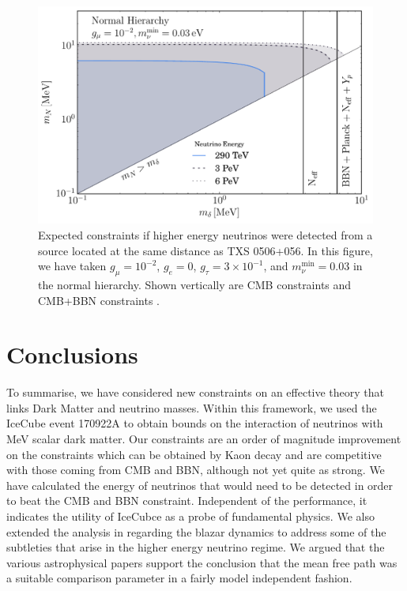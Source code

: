 \documentclass[11pt]{article}
\numberwithin{equation}{section}
\numberwithin{figure}{section}
\numberwithin{table}{section}
\begin{document}
\begin{figure}[t]
 \centering
 \includegraphics[width=.8\textwidth]{mpmnconstraints.pdf}
 \caption{Expected constraints if higher energy neutrinos were detected from a source located at the same distance as TXS 0506+056. In this figure, we have taken $g_\mu = 10^{-2}$, $g_e = 0$, $g_\tau = 3 \times 10^{-1}$, and $m_\nu^{\mathrm{min}} = 0.03$ in the normal hierarchy. Shown vertically are CMB constraints \cite{Boehm} and CMB+BBN constraints \cite{Nollett2015}.}
 \label{fig:mpmn}
\end{figure}


\section{Conclusions}\label{sec:conclusion}

To summarise, we have considered new constraints on an effective theory that links Dark Matter and neutrino masses. Within this framework, we used the IceCube event 170922A to obtain bounds on the interaction of neutrinos with MeV scalar dark matter. Our constraints are an order of magnitude improvement on the constraints which can be obtained by Kaon decay and are competitive with those coming from CMB and BBN, although not yet quite as strong.  We have calculated the energy of neutrinos that would need to be detected in order to beat the CMB and BBN constraint. Independent of the performance, it indicates the utility of IceCubce as a probe of fundamental physics. We also extended the analysis in \cite{Kelly} regarding the blazar dynamics to address some of the subtleties that arise in the higher energy neutrino regime. We argued that the various astrophysical papers \cite{Padovani2018, Padovani2019, Keivani2018} support the conclusion that the mean free path was a suitable comparison parameter in a fairly model independent fashion.
\end{document}

